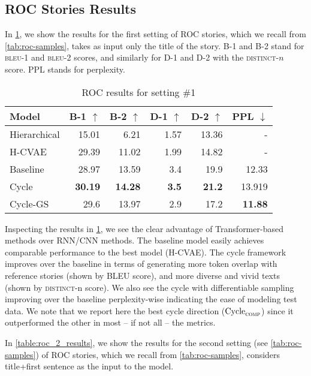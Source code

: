 \subsection{ROC Stories Results}
\label{sec:roc_results}

In \cref{table:roc_1_results}, we show the results for the first setting of ROC stories, which we recall from \cref{tab:roc-samples}, takes as input only the title of the story. B-1 and B-2 stand for \textsc{bleu}-1 and \textsc{bleu}-2 scores, and similarly for D-1 and D-2 with the \textsc{distinct}-$n$ score. PPL stands for perplexity.

\begin{table}[ht]
\centering
\begin{tabular}{l|rr|rr|r}
Model & B-1 $\uparrow$ & B-2 $\uparrow$ & D-1 $\uparrow$ & D-2 $\uparrow$ & PPL $\downarrow$  \\ \hline
Hierarchical & 15.01 & 6.21 & 1.57 & 13.36 & - \\
H-CVAE & 29.39 & 11.02 & 1.99 & 14.82 & - \\ \hline
Baseline & 28.97 & 13.59 & 3.4 & 19.9  & 12.33 \\
Cycle & \textbf{30.19} & \textbf{14.28} & \textbf{3.5} & \textbf{21.2} & 13.919 \\
Cycle-GS & 29.6 & 13.97 & 2.9 & 17.2 & \textbf{11.88}
\end{tabular}
\caption{ROC results for setting \#1}
\label{table:roc_1_results}
\end{table}

Inspecting the results in \cref{table:roc_1_results}, we see the clear advantage of Transformer-based methods over RNN/CNN methods. The baseline model easily achieves comparable performance to the best model (H-CVAE). The cycle framework improves over the baseline in terms of generating more token overlap with reference stories (shown by BLEU score), and more diverse and vivid texts (shown by \textsc{distinct}-n score). We also see the cycle with differentiable sampling improving over the baseline perplexity-wise indicating the ease of modeling test data. We note that we report here the best cycle direction ($\text{Cycle}_{\textsc{comp}}$) since it outperformed the other in most -- if not all -- the metrics.

In \cref{table:roc_2_results}, we show the results for the second setting (see \cref{tab:roc-samples}) of ROC stories, which we recall from \cref{tab:roc-samples}, considers title+first sentence as the input to the model.


